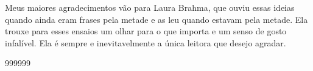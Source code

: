 \par
 
Meus maiores agradecimentos vão para Laura Brahma, que ouviu essas ideias quando ainda eram frases pela metade e as leu quando estavam pela metade. Ela trouxe para esses ensaios um olhar para o que importa e um senso de gosto infalível. Ela é sempre e inevitavelmente a única leitora que desejo agradar.
 
\par
  
 
999999
